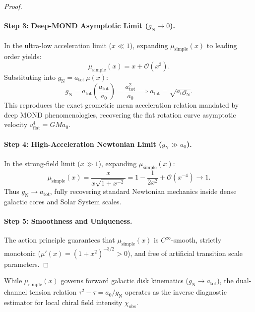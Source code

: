 \documentclass[11pt]{article}
\theoremstyle{definition}
\theoremstyle{remark}
\begin{document}
\begin{proof}
\paragraph{Step 3: Deep-MOND Asymptotic Limit ($g_{\text{N}} \to 0$).}
In the ultra-low acceleration limit ($x \ll 1$), expanding $\mu_{\text{simple}}(x)$ to leading order yields:
\begin{equation}
\mu_{\text{simple}}(x) = x + \mathcal{O}(x^3).
\end{equation}
Substituting into $g_{\text{N}} = a_{\text{tot}} \, \mu(x)$:
\begin{equation}
g_{\text{N}} = a_{\text{tot}} \left(\frac{a_{\text{tot}}}{a_0}\right) = \frac{a_{\text{tot}}^2}{a_0} \implies a_{\text{tot}} = \sqrt{a_0 g_{\text{N}}}.
\end{equation}
This reproduces the exact geometric mean acceleration relation mandated by deep MOND phenomenologies, recovering the flat rotation curve asymptotic velocity $v_{\text{flat}}^4 = G M a_0$.

\paragraph{Step 4: High-Acceleration Newtonian Limit ($g_{\text{N}} \gg a_0$).}
In the strong-field limit ($x \gg 1$), expanding $\mu_{\text{simple}}(x)$:
\begin{equation}
\mu_{\text{simple}}(x) = \frac{x}{x \sqrt{1 + x^{-2}}} = 1 - \frac{1}{2x^2} + \mathcal{O}(x^{-4}) \to 1.
\end{equation}
Thus $g_{\text{N}} \to a_{\text{tot}}$, fully recovering standard Newtonian mechanics inside dense galactic cores and Solar System scales.

\paragraph{Step 5: Smoothness and Uniqueness.}
The action principle guarantees that $\mu_{\text{simple}}(x)$ is $C^\infty$-smooth, strictly monotonic ($\mu'(x) = (1+x^2)^{-3/2} > 0$), and free of artificial transition scale parameters.
\end{proof}

\begin{proposition}
While $\mu_{\text{simple}}(x)$ governs forward galactic disk kinematics ($g_{\text{N}} \to a_{\text{tot}}$), the dual-channel tension relation $\tau^2 - \tau = a_0 / g_{\text{N}}$ operates as the inverse diagnostic estimator for local chiral field intensity $\chi_{\text{obs}}$.
\end{proposition}
\end{document}
